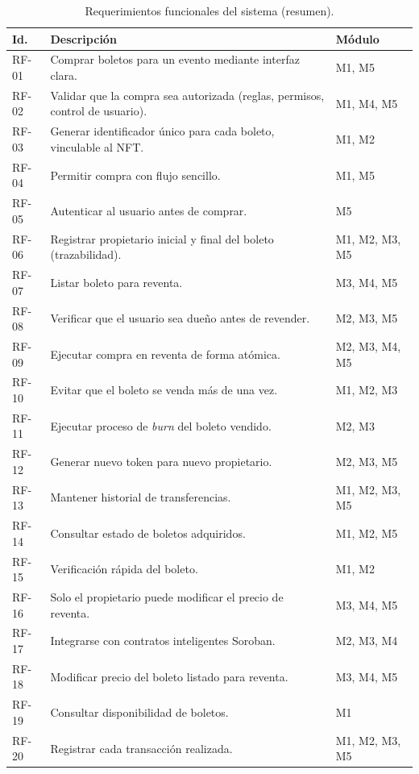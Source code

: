 \begin{table}[H]
\centering
\scriptsize
\renewcommand{\arraystretch}{1.3}
\caption{Requerimientos funcionales del sistema (resumen).}
\label{tab:rf}
\begin{tabularx}{\textwidth}{>{}p{1.0cm} >{\raggedright\arraybackslash}X
>{\raggedright\arraybackslash}p{2.0cm}}
\toprule
\rowcolor{rowgray}
\textbf{Id.} & \textbf{Descripción} & \textbf{Módulo} \\
\midrule
RF-01 & Comprar boletos para un evento mediante interfaz clara. & M1, M5 \\
\rowcolor{rowgray}
RF-02 & Validar que la compra sea autorizada (reglas, permisos, control de usuario). & M1, M4, M5 \\
RF-03 & Generar identificador único para cada boleto, vinculable al NFT. & M1, M2 \\
\rowcolor{rowgray}
RF-04 & Permitir compra con flujo sencillo. & M1, M5 \\
RF-05 & Autenticar al usuario antes de comprar. & M5 \\
\rowcolor{rowgray}
RF-06 & Registrar propietario inicial y final del boleto (trazabilidad). & M1, M2, M3, M5 \\
RF-07 & Listar boleto para reventa. & M3, M4, M5 \\
\rowcolor{rowgray}
RF-08 & Verificar que el usuario sea dueño antes de revender. & M2, M3, M5 \\
RF-09 & Ejecutar compra en reventa de forma atómica. & M2, M3, M4, M5 \\
\rowcolor{rowgray}
RF-10 & Evitar que el boleto se venda más de una vez. & M1, M2, M3 \\
RF-11 & Ejecutar proceso de \textit{burn} del boleto vendido. & M2, M3 \\
\rowcolor{rowgray}
RF-12 & Generar nuevo token para nuevo propietario. & M2, M3, M5 \\
RF-13 & Mantener historial de transferencias. & M1, M2, M3, M5 \\
\rowcolor{rowgray}
RF-14 & Consultar estado de boletos adquiridos. & M1, M2, M5 \\
RF-15 & Verificación rápida del boleto. & M1, M2 \\
\rowcolor{rowgray}
RF-16 & Solo el propietario puede modificar el precio de reventa. & M3, M4, M5 \\
RF-17 & Integrarse con contratos inteligentes Soroban. & M2, M3, M4 \\
\rowcolor{rowgray}
RF-18 & Modificar precio del boleto listado para reventa. & M3, M4, M5 \\
RF-19 & Consultar disponibilidad de boletos. & M1 \\
\rowcolor{rowgray}
RF-20 & Registrar cada transacción realizada. & M1, M2, M3, M5 \\
\bottomrule
\end{tabularx}
\end{table}

